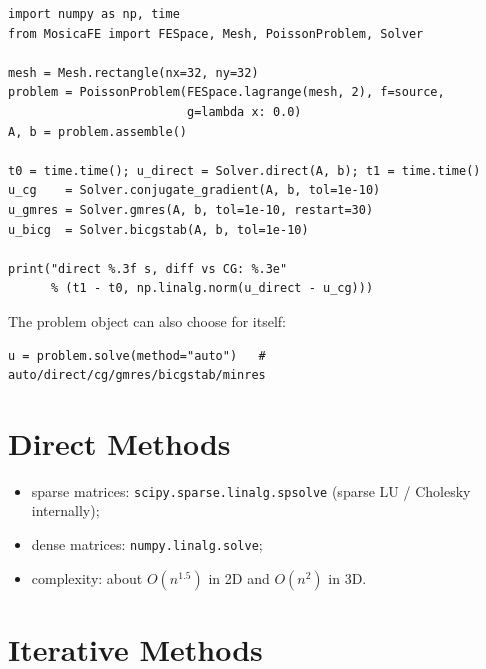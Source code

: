 \documentclass[11pt,oneside]{book}
\theoremstyle{definition}
\theoremstyle{plain}
\newcommand{\code}[1]{\texttt{#1}}
\begin{document}
\begin{lstlisting}[language=MosicaFE,caption={The \code{Solver} interface}]
import numpy as np, time
from MosicaFE import FESpace, Mesh, PoissonProblem, Solver

mesh = Mesh.rectangle(nx=32, ny=32)
problem = PoissonProblem(FESpace.lagrange(mesh, 2), f=source,
                         g=lambda x: 0.0)
A, b = problem.assemble()

t0 = time.time(); u_direct = Solver.direct(A, b); t1 = time.time()
u_cg    = Solver.conjugate_gradient(A, b, tol=1e-10)
u_gmres = Solver.gmres(A, b, tol=1e-10, restart=30)
u_bicg  = Solver.bicgstab(A, b, tol=1e-10)

print("direct %.3f s, diff vs CG: %.3e"
      % (t1 - t0, np.linalg.norm(u_direct - u_cg)))
\end{lstlisting}

The problem object can also choose for itself:

\begin{lstlisting}[language=MosicaFE]
u = problem.solve(method="auto")   # auto/direct/cg/gmres/bicgstab/minres
\end{lstlisting}

\section{Direct Methods}

\begin{itemize}[itemsep=0.2em]
  \item sparse matrices: \code{scipy.sparse.linalg.spsolve} (sparse LU / Cholesky
        internally);
  \item dense matrices: \code{numpy.linalg.solve};
  \item complexity: about $O(n^{1.5})$ in 2D and $O(n^{2})$ in 3D.
\end{itemize}

\section{Iterative Methods}
\end{document}
